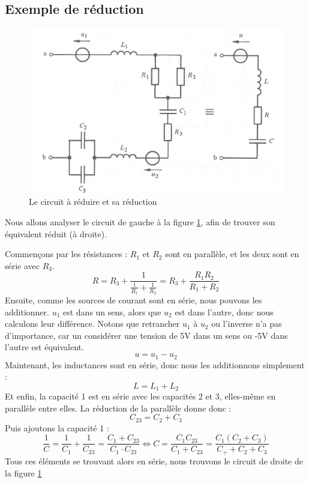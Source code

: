 \documentclass[12pt,a4paper]{article}
\begin{document}
\subsection{Exemple de réduction}
\label{Exemple: reduction de base}
\begin{figure}
	\centering
	\includegraphics[scale=0.5]{images/exemple_combinaison_serie_parallele}
	\caption{Le circuit à réduire et sa réduction}
	\label{fig: exemple reduction serie/parallele}
\end{figure}
Nous allons analyser le circuit de gauche à la figure \ref{fig: exemple reduction serie/parallele}, afin de trouver son équivalent réduit (à droite). 

Commençons par les résistances : $R_1$ et $R_2$ sont en parallèle, et les deux sont en série avec $R_3$.
\[R = R_3 + \frac{1}{\frac{1}{R_1} + \frac{1}{R_2}} = R_3 + \frac{R_1R_2}{R_1+R_2}\]
Ensuite, comme les sources de courant sont en série, nous pouvons les additionner. $u_1$ est dans un sens, alors que $u_2$ est dans l'autre, donc nous calculons leur différence. Notons que retrancher $u_1$ à $u_2$ ou l'inverse n'a pas d'importance, car un considérer une tension de 5V dans un sens ou -5V dans l'autre est équivalent.
\[u = u_1 - u_2\]
Maintenant, les inductances sont en série, donc nous les additionnons simplement :
\[L = L_1 + L_2\]
Et enfin, la capacité 1 est en série avec les capacités 2 et 3, elles-même en parallèle entre elles. La réduction de la parallèle donne donc :
\[C_{23} = C_2 + C_3\]
Puis ajoutons la capacité 1 :
\[\frac{1}{C} = \frac{1}{C_1} + \frac{1}{C_{23}} = \frac{C_1 + C_{23}}{C_1\cdot C_{23}} \iff C = \frac{C_1C_{23}}{C_1 + C_{23}} = \frac{C_1(C_2 + C_3)}{C_++C_2+C_3}\]
Tous ces éléments se trouvant alors en série, nous trouvons le circuit de droite de la figure \ref{fig: exemple reduction serie/parallele}
\end{document}
